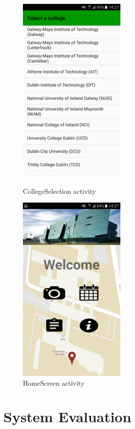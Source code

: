 \begin{figure}[b]
	\begin{minipage}[h]{0.4\textwidth}
		\includegraphics{img/collegeselection.png}
		\caption{CollegeSelection activity}
	\end{minipage}
	\hfill
	\begin{minipage}[h]{0.4\textwidth}
		\includegraphics{img/homescreen.png}
		\caption{HomeScreen activity}
	\end{minipage}
\end{figure}

\chapter{System Evaluation}
